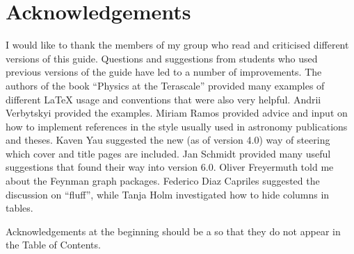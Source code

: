 \chapter*{Acknowledgements}%
\label{sec:ack1}

I would like to thank the members of my group who read and criticised
different versions of this guide. Questions and suggestions from
students who used previous versions of the guide have led to a number
of improvements. The authors of the book \enquote{Physics at the
Terascale} provided many examples of different \LaTeX{} usage and
conventions that were also very helpful.
Andrii Verbytskyi provided the \TikZ examples.
Miriam Ramos provided advice and input on how to implement references 
in the style usually used in astronomy publications and theses.
Kaven Yau suggested the new (as of version 4.0) way of steering which cover
and title pages are included.
Jan Schmidt provided many useful suggestions that found their way into version 6.0.
Oliver Freyermuth told me about the \TikZ Feynman graph packages.
Federico Diaz Capriles suggested the discussion on \enquote{fluff},
while Tanja Holm investigated how to hide columns in tables.

Acknowledgements at the beginning should be a  so that they
do not appear in the Table of Contents.

